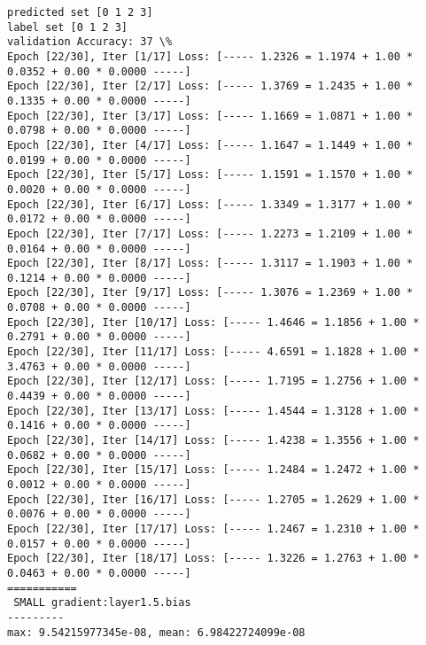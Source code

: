 \documentclass[11pt]{article}
\begin{document}
    \begin{Verbatim}[commandchars=\\\{\}]
predicted set [0 1 2 3]
label set [0 1 2 3]
validation Accuracy: 37 \%
Epoch [22/30], Iter [1/17] Loss: [----- 1.2326 = 1.1974 + 1.00 * 0.0352 + 0.00 * 0.0000 -----]
Epoch [22/30], Iter [2/17] Loss: [----- 1.3769 = 1.2435 + 1.00 * 0.1335 + 0.00 * 0.0000 -----]
Epoch [22/30], Iter [3/17] Loss: [----- 1.1669 = 1.0871 + 1.00 * 0.0798 + 0.00 * 0.0000 -----]
Epoch [22/30], Iter [4/17] Loss: [----- 1.1647 = 1.1449 + 1.00 * 0.0199 + 0.00 * 0.0000 -----]
Epoch [22/30], Iter [5/17] Loss: [----- 1.1591 = 1.1570 + 1.00 * 0.0020 + 0.00 * 0.0000 -----]
Epoch [22/30], Iter [6/17] Loss: [----- 1.3349 = 1.3177 + 1.00 * 0.0172 + 0.00 * 0.0000 -----]
Epoch [22/30], Iter [7/17] Loss: [----- 1.2273 = 1.2109 + 1.00 * 0.0164 + 0.00 * 0.0000 -----]
Epoch [22/30], Iter [8/17] Loss: [----- 1.3117 = 1.1903 + 1.00 * 0.1214 + 0.00 * 0.0000 -----]
Epoch [22/30], Iter [9/17] Loss: [----- 1.3076 = 1.2369 + 1.00 * 0.0708 + 0.00 * 0.0000 -----]
Epoch [22/30], Iter [10/17] Loss: [----- 1.4646 = 1.1856 + 1.00 * 0.2791 + 0.00 * 0.0000 -----]
Epoch [22/30], Iter [11/17] Loss: [----- 4.6591 = 1.1828 + 1.00 * 3.4763 + 0.00 * 0.0000 -----]
Epoch [22/30], Iter [12/17] Loss: [----- 1.7195 = 1.2756 + 1.00 * 0.4439 + 0.00 * 0.0000 -----]
Epoch [22/30], Iter [13/17] Loss: [----- 1.4544 = 1.3128 + 1.00 * 0.1416 + 0.00 * 0.0000 -----]
Epoch [22/30], Iter [14/17] Loss: [----- 1.4238 = 1.3556 + 1.00 * 0.0682 + 0.00 * 0.0000 -----]
Epoch [22/30], Iter [15/17] Loss: [----- 1.2484 = 1.2472 + 1.00 * 0.0012 + 0.00 * 0.0000 -----]
Epoch [22/30], Iter [16/17] Loss: [----- 1.2705 = 1.2629 + 1.00 * 0.0076 + 0.00 * 0.0000 -----]
Epoch [22/30], Iter [17/17] Loss: [----- 1.2467 = 1.2310 + 1.00 * 0.0157 + 0.00 * 0.0000 -----]
Epoch [22/30], Iter [18/17] Loss: [----- 1.3226 = 1.2763 + 1.00 * 0.0463 + 0.00 * 0.0000 -----]
===========
 SMALL gradient:layer1.5.bias
---------
max: 9.54215977345e-08, mean: 6.98422724099e-08

    \end{Verbatim}

    \begin{center}
    \end{center}
    { \hspace*{\fill} \\}
    
    \begin{center}
    \end{center}
    { \hspace*{\fill} \\}
    
\end{document}
